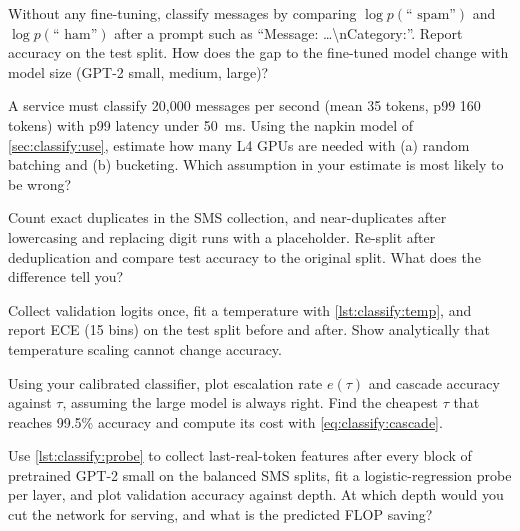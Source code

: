 \begin{exercise}
Without any fine-tuning, classify messages by comparing $\log p(\text{`` spam''})$ and
$\log p(\text{`` ham''})$ after a prompt such as
``Message: \dots\textbackslash nCategory:''. Report accuracy on the test split. How
does the gap to the fine-tuned model change with model size (GPT-2 small, medium,
large)?
\end{exercise}

\begin{exercise}
A service must classify 20{,}000 messages per second (mean 35 tokens, p99 160 tokens)
with p99 latency under \SI{50}{ms}. Using the napkin model of
\cref{sec:classify:use}, estimate how many L4 GPUs are needed with (a) random batching
and (b) bucketing. Which assumption in your estimate is most likely to be wrong?
\end{exercise}

\begin{exercise}[Deduplication]
Count exact duplicates in the SMS collection, and near-duplicates after lowercasing and
replacing digit runs with a placeholder. Re-split after deduplication and compare test
accuracy to the original split. What does the difference tell you?
\end{exercise}

\begin{exercise}[Calibration]
Collect validation logits once, fit a temperature with \cref{lst:classify:temp}, and
report ECE (15 bins) on the test split before and after. Show analytically that
temperature scaling cannot change accuracy.
\end{exercise}

\begin{exercise}
Using your calibrated classifier, plot escalation rate $e(\tau)$ and cascade accuracy
against $\tau$, assuming the large model is always right. Find the cheapest $\tau$
that reaches 99.5\% accuracy and compute its cost with \cref{eq:classify:cascade}.
\end{exercise}

\begin{exercise}\label{ex:classify:probe}
Use \cref{lst:classify:probe} to collect last-real-token features after every block of
pretrained GPT-2 small on the balanced SMS splits, fit a logistic-regression probe per
layer, and plot validation accuracy against depth. At which depth would you cut the
network for serving, and what is the predicted FLOP saving?
\end{exercise}


